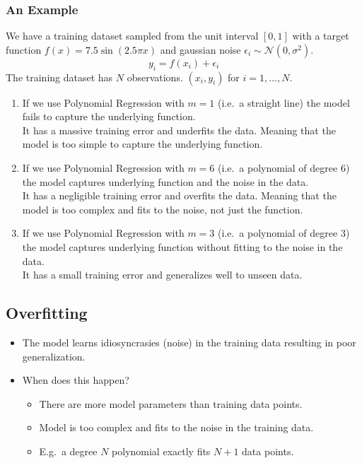 \documentclass[12pt]{article}
\begin{document}
        \subsubsection{An Example}
            We have a training dataset sampled from the unit interval $[0, 1]$ with a target function $f(x) = 7.5\sin(2.5\pi{}x)$ 
            and gaussian noise $\epsilon_i \sim \mathcal{N}(0, \sigma^2)$.
            \begin{equation}
                y_i = f(x_i) + \epsilon_i
            \end{equation}
            The training dataset has $N$ observations. $(x_i, y_i)$ for $i = 1, \ldots, N$.
            \begin{enumerate}
                \item If we use Polynomial Regression with $m = 1$ (i.e.\ a straight line) the model fails to capture the underlying function. \\
                It has a massive training error and underfits the data. Meaning that the model is too simple to capture the underlying function.
                \item If we use Polynomial Regression with $m = 6$ (i.e.\ a polynomial of degree $6$) the model captures underlying function and the noise in the data. \\
                It has a negligible training error and overfits the data. Meaning that the model is too complex and fits to the noise, not just the function.
                \item If we use Polynomial Regression with $m = 3$ (i.e.\ a polynomial of degree $3$) the model captures underlying function without fitting to the noise in the data. \\
                It has a small training error and generalizes well to unseen data.
            \end{enumerate}
        \subsection{Overfitting}
            \begin{itemize}
                \item The model learns idiosyncrasies (noise) in the training data resulting in poor generalization.
                \item When does this happen?
                \begin{itemize}
                    \item There are more model parameters than training data points.
                    \item Model is too complex and fits to the noise in the training data.
                    \item E.g.\ a degree $N$ polynomial exactly fits $N+1$ data points.
                \end{itemize}
            \end{itemize}
\end{document}
